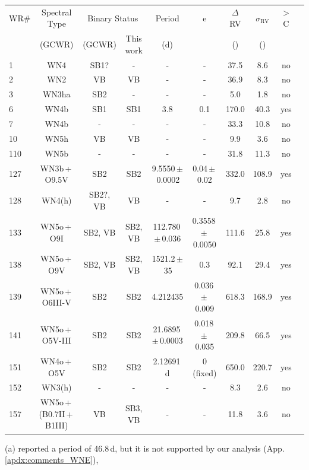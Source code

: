 \begin{table}
\begin{threeparttable}
\begin{tabular*}{\textwidth}{l @{\extracolsep{\fill}}*{9}{c}}
WR\# & Spectral Type & \multicolumn{2}{c}{Binary Status} & Period & e & $\Delta$ RV  & $\sigma_{\textrm{RV}}$ & \DelRV{} $>$ C\\
 & (GCWR) & (GCWR) & This work & (d) & &(\kms{}) &(\kms{}) &  \\ \midrule
1 & WN4 & SB1? & - & - & - & 37.5 & 8.6 & no\\
2 & WN2 & VB & VB\tnote{(l)} & - & - & 36.9 & 8.3 & no\\
3 & WN3ha & SB2 & - & -\tnote{(a)} & - & 5.0 & 1.8 & no\\
6 & WN4b & SB1 & SB1 & 3.8\tnote{(b)} & 0.1\tnote{(b)} & 170.0 & 40.3 & yes\\
7 & WN4b & - & - & - & - & 33.3 & 10.8 & no\\
10 & WN5h & VB & VB\tnote{(l)} & - & - & 9.9 & 3.6 & no\\
110 & WN5b & - & - & - & - & 31.8 & 11.3 & no\\
127 & WN3b\,+\,O9.5V & SB2 & SB2 & 9.5550\,$\pm$\,0.0002\tnote{(c)} & 0.04\,$\pm$\,0.02\tnote{(c)} & 332.0 & 108.9 & yes\\
128 & WN4(h) & SB2?, VB & VB\tnote{(l)} & - & - & 9.7 & 2.8 & no\\
133 & WN5o\,+\,O9I & SB2, VB & SB2, VB\tnote{(l)} & 112.780\,$\pm$\,0.036\tnote{(d)} & 0.3558\,$\pm$\,0.0050\tnote{(d)} & 111.6 & 25.8 & yes\\
138 & WN5o\,+\,O9V\tnote{(e)} & SB2, VB & SB2, VB\tnote{(l)} & 1521.2\,$\pm$\,35\tnote{(f)} & 0.3\tnote{(g)} & 92.1 & 29.4 & yes\\
139 & WN5o\,+\,O6III-V & SB2 & SB2 & 4.212435\tnote{(h)} & 0.036\,$\pm$\,0.009\tnote{(h)} & 618.3 & 168.9 & yes\\
141 & WN5o\,+\,O5V-III & SB2 & SB2 & 21.6895\,$\pm$\,0.0003\tnote{(i)} & 0.018\,$\pm$\,0.035\tnote{(i)} & 209.8 & 66.5 & yes\\
151 & WN4o\,+\,O5V & SB2 & SB2 & 2.12691\,d\tnote{(j)} & 0 (fixed)\tnote{(j)} & 650.0 & 220.7 & yes\\
152 & WN3(h) & - & - & - & - & 8.3 & 2.6 & no\\
157 & WN5o\,+\,(B0.7II\,+\,B1III)\tnote{(k)} & VB & SB3, VB\tnote{(l)} & - & - & 11.8 & 3.6 & no\\
\bottomrule
\end{tabular*}
\begin{tablenotes}
   \item[(a)] \citet{1986Moffat+abs} reported a period of 46.8\,d, but it is not supported by our analysis (App. \ref{apdx:comments_WNE}),

\end{tablenotes}
\end{threeparttable}
\end{table}
